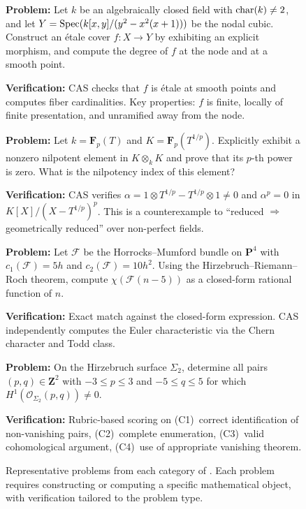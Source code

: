 \begin{figure}[t]
\begin{problembox}[title={\textbf{Example} (\ecagid{0158}, Level 2, Basic Concepts)}]
\textbf{Problem:} Let $k$ be an algebraically closed field with $\operatorname{char}(k) \neq 2$, and let $Y = \operatorname{Spec}(k[x,y]/(y^2 - x^2(x+1)))$ be the nodal cubic. Construct an \'etale cover $f: X \to Y$ by exhibiting an explicit morphism, and compute the degree of $f$ at the node and at a smooth point.

\smallskip
\noindent\textbf{Verification:} CAS checks that $f$ is \'etale at smooth points and computes fiber cardinalities. Key properties: $f$ is finite, locally of finite presentation, and unramified away from the node.
\end{problembox}

\begin{problembox}[title={\textbf{Counterexample} (\ecagid{0005}, Level 2, Basic Concepts)}]
\textbf{Problem:} Let $k = \mathbf{F}_p(T)$ and $K = \mathbf{F}_p(T^{1/p})$. Explicitly exhibit a nonzero nilpotent element in $K \otimes_k K$ and prove that its $p$-th power is zero. What is the nilpotency index of this element?

\smallskip
\noindent\textbf{Verification:} CAS verifies $\alpha = 1 \otimes T^{1/p} - T^{1/p} \otimes 1 \neq 0$ and $\alpha^p = 0$ in $K[X]/(X-T^{1/p})^p$. This is a counterexample to ``reduced $\Rightarrow$ geometrically reduced'' over non-perfect fields.
\end{problembox}

\begin{problembox}[title={\textbf{Computation} (\ecagid{0230}, Level 2, Computations)}]
\textbf{Problem:} Let $\mathscr{F}$ be the Horrocks--Mumford bundle on $\mathbf{P}^4$ with $c_1(\mathscr{F}) = 5h$ and $c_2(\mathscr{F}) = 10h^2$. Using the Hirzebruch--Riemann--Roch theorem, compute $\chi(\mathscr{F}(n-5))$ as a closed-form rational function of $n$.

\smallskip
\noindent\textbf{Verification:} Exact match against the closed-form expression. CAS independently computes the Euler characteristic via the Chern character and Todd class.
\end{problembox}

\begin{problembox}[title={\textbf{Proof} (\ecagid{0240}, Level 2, Computations)}]
\textbf{Problem:} On the Hirzebruch surface $\Sigma_2$, determine all pairs $(p,q) \in \mathbf{Z}^2$ with $-3 \leq p \leq 3$ and $-5 \leq q \leq 5$ for which $H^1(\mathcal{O}_{\Sigma_2}(p,q)) \neq 0$.

\smallskip
\noindent\textbf{Verification:} Rubric-based scoring on (C1)~correct identification of non-vanishing pairs, (C2)~complete enumeration, (C3)~valid cohomological argument, (C4)~use of appropriate vanishing theorem.
\end{problembox}
\caption{Representative problems from each category of \ecagbench{}. Each problem requires constructing or computing a specific mathematical object, with verification tailored to the problem type.}
\label{fig:example-problems}
\end{figure}

